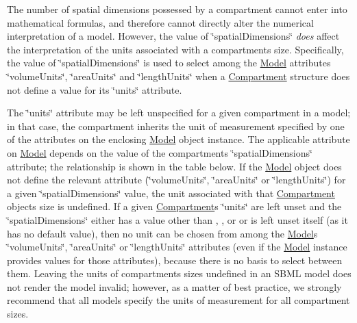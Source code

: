 The number of spatial dimensions possessed by a compartment cannot enter into mathematical formulas, and therefore cannot directly alter the numerical interpretation of a model. However, the value of \char`\"{}spatial\+Dimensions\char`\"{} {\itshape does} affect the interpretation of the units associated with a compartment\textquotesingle{}s size. Specifically, the value of \char`\"{}spatial\+Dimensions\char`\"{} is used to select among the \hyperlink{class_model}{Model} attributes \char`\"{}volume\+Units\char`\"{}, \char`\"{}area\+Units\char`\"{} and \char`\"{}length\+Units\char`\"{} when a \hyperlink{class_compartment}{Compartment} structure does not define a value for its \char`\"{}units\char`\"{} attribute.

The \char`\"{}units\char`\"{} attribute may be left unspecified for a given compartment in a model; in that case, the compartment inherits the unit of measurement specified by one of the attributes on the enclosing \hyperlink{class_model}{Model} object instance. The applicable attribute on \hyperlink{class_model}{Model} depends on the value of the compartment\textquotesingle{}s \char`\"{}spatial\+Dimensions\char`\"{} attribute; the relationship is shown in the table below. If the \hyperlink{class_model}{Model} object does not define the relevant attribute (\char`\"{}volume\+Units\char`\"{}, \char`\"{}area\+Units\char`\"{} or \char`\"{}length\+Units\char`\"{}) for a given \char`\"{}spatial\+Dimensions\char`\"{} value, the unit associated with that \hyperlink{class_compartment}{Compartment} object\textquotesingle{}s size is undefined. If a given \hyperlink{class_compartment}{Compartment}\textquotesingle{}s \char`\"{}units\char`\"{} are left unset and the \char`\"{}spatial\+Dimensions\char`\"{} either has a value other than {}, {}, or {} or is left unset itself (as it has no default value), then no unit can be chosen from among the \hyperlink{class_model}{Model}\textquotesingle{}s \char`\"{}volume\+Units\char`\"{}, \char`\"{}area\+Units\char`\"{} or \char`\"{}length\+Units\char`\"{} attributes (even if the \hyperlink{class_model}{Model} instance provides values for those attributes), because there is no basis to select between them. Leaving the units of compartments\textquotesingle{} sizes undefined in an S\+B\+ML model does not render the model invalid; however, as a matter of best practice, we strongly recommend that all models specify the units of measurement for all compartment sizes.


